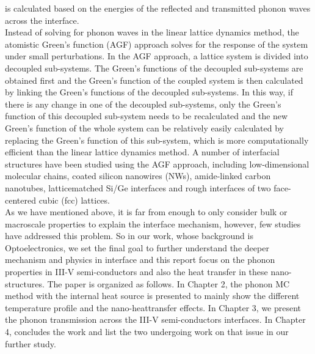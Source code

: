 is calculated based on the energies of the reflected and
transmitted phonon waves across the interface.\\
\indent Instead of solving for phonon waves in the linear
lattice dynamics method, the atomistic Green’s function
(AGF) approach solves for the response of the system
under small perturbations. In the AGF approach, a lattice
system is divided into decoupled sub-systems. The Green’s
functions of the decoupled sub-systems are obtained first
and the Green’s function of the coupled system is then
calculated by linking the Green’s functions of the decoupled
sub-systems. In this way, if there is any change in one of
the decoupled sub-systems, only the Green’s function of
this decoupled sub-system needs to be recalculated and the
new Green’s function of the whole system can be relatively
easily calculated by replacing the Green’s function of this
sub-system, which is more computationally efficient than
the linear lattice dynamics method. A number of interfacial
structures have been studied using the AGF approach,
including low-dimensional molecular chains, coated silicon
nanowires (NWs), amide-linked carbon nanotubes, latticematched
Si/Ge interfaces and rough interfaces of two
face-centered cubic (fcc) lattices\cite{ozpineci2001quantum,zhao2009phonon,dhar2006heat}.\\
\indent As we have mentioned above, it is far from enough to only consider bulk or macroscale properties to explain the interface mechanism, however, few studies have addressed this problem. So in our work, whose background is Optoelectronics, we set the final goal to further understand the deeper mechanism and physics in interface and this report focus on the phonon properties in III-V semi-conductors and also the heat transfer in these nano-structures. The paper is organized as follows.
In Chapter 2, the phonon MC method with the internal heat source is presented to mainly show the different temperature profile and the nano-heattransfer effects. In Chapter 3, we present the phonon transmission across the III-V semi-conductors interfaces. In Chapter 4, concludes the work and list the two undergoing work on that issue in our further study.

